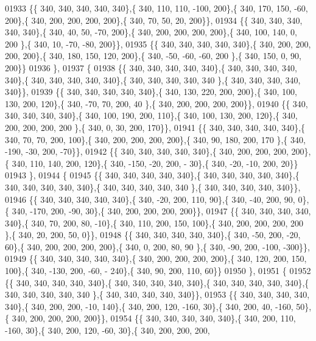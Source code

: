 \begin{DoxyCode}
01933 \{\{ 340, 340, 340, 340, 340\},\{ 340, 110, 110, -100, 200\},\{ 340, 170, 150, -60, 200\},\{ 340, 200, 200, 200, 
      200\},\{ 340,  70,  50,  20, 200\}\},
01934 \{\{ 340, 340, 340, 340, 340\},\{ 340,  40,  50, -70, 200\},\{ 340, 200, 200, 200, 200\},\{ 340, 100, 140,   0, 200
      \},\{ 340,  10, -70, -80, 200\}\},
01935 \{\{ 340, 340, 340, 340, 340\},\{ 340, 200, 200, 200, 200\},\{ 340, 180, 150, 120, 200\},\{ 340, -50, -60, -60, 200
      \},\{ 340, 150,   0,  90, 200\}\}
01936 \},
01937 \{
01938 \{\{ 340, 340, 340, 340, 340\},\{ 340, 340, 340, 340, 340\},\{ 340, 340, 340, 340, 340\},\{ 340, 340, 340, 340, 340
      \},\{ 340, 340, 340, 340, 340\}\},
01939 \{\{ 340, 340, 340, 340, 340\},\{ 340, 130, 220, 200, 200\},\{ 340, 100, 130, 200, 120\},\{ 340, -70,  70, 200,  40
      \},\{ 340, 200, 200, 200, 200\}\},
01940 \{\{ 340, 340, 340, 340, 340\},\{ 340, 100, 190, 200, 110\},\{ 340, 100, 130, 200, 120\},\{ 340, 200, 200, 200, 200
      \},\{ 340,   0,  30, 200, 170\}\},
01941 \{\{ 340, 340, 340, 340, 340\},\{ 340,  70,  70, 200, 100\},\{ 340, 200, 200, 200, 200\},\{ 340,  90, 180, 200, 170
      \},\{ 340, -190, -30, 200, -70\}\},
01942 \{\{ 340, 340, 340, 340, 340\},\{ 340, 200, 200, 200, 200\},\{ 340, 110, 140, 200, 120\},\{ 340, -150, -20, 200, -
      30\},\{ 340, -20, -10, 200,  20\}\}
01943 \},
01944 \{
01945 \{\{ 340, 340, 340, 340, 340\},\{ 340, 340, 340, 340, 340\},\{ 340, 340, 340, 340, 340\},\{ 340, 340, 340, 340, 340
      \},\{ 340, 340, 340, 340, 340\}\},
01946 \{\{ 340, 340, 340, 340, 340\},\{ 340, -20, 200, 110,  90\},\{ 340, -40, 200,  90,   0\},\{ 340, -170, 200, -90,  
      30\},\{ 340, 200, 200, 200, 200\}\},
01947 \{\{ 340, 340, 340, 340, 340\},\{ 340,  70, 200,  80, -10\},\{ 340, 110, 200, 150, 100\},\{ 340, 200, 200, 200, 200
      \},\{ 340,  20, 200,  50,   0\}\},
01948 \{\{ 340, 340, 340, 340, 340\},\{ 340, -50, 200, -20,  60\},\{ 340, 200, 200, 200, 200\},\{ 340,   0, 200,  80,  90
      \},\{ 340, -90, 200, -100, -300\}\},
01949 \{\{ 340, 340, 340, 340, 340\},\{ 340, 200, 200, 200, 200\},\{ 340, 120, 200, 150, 100\},\{ 340, -130, 200, -60, -
      240\},\{ 340,  90, 200, 110,  60\}\}
01950 \},
01951 \{
01952 \{\{ 340, 340, 340, 340, 340\},\{ 340, 340, 340, 340, 340\},\{ 340, 340, 340, 340, 340\},\{ 340, 340, 340, 340, 340
      \},\{ 340, 340, 340, 340, 340\}\},
01953 \{\{ 340, 340, 340, 340, 340\},\{ 340, 200, 200, -10, 140\},\{ 340, 200, 120, -160,  30\},\{ 340, 200,  40, -160,  
      50\},\{ 340, 200, 200, 200, 200\}\},
01954 \{\{ 340, 340, 340, 340, 340\},\{ 340, 200, 110, -160,  30\},\{ 340, 200, 120, -60,  30\},\{ 340, 200, 200, 200, 

\end{DoxyCode}
